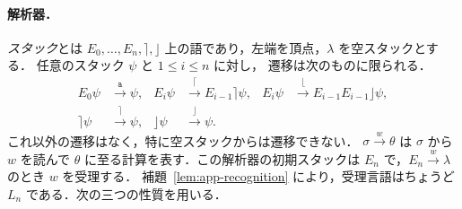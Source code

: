 \documentclass[11pt,a4paper]{ltjsarticle}
\theoremstyle{remark}
\theoremstyle{plain}
\begin{document}
\paragraph{解析器．}
\emph{スタック}とは $E_0,\ldots,E_n,\rceil,\rfloor$
上の語であり，左端を頂点，$\lambda$ を空スタックとする．
任意のスタック $\psi$ と $1\le i\le n$ に対し，
遷移は次のものに限られる．
\[
\begin{aligned}
E_0\psi&\xrightarrow{\mathtt a}\psi,&
E_i\psi&\xrightarrow{\lceil}E_{i-1}\rceil\psi,&
E_i\psi&\xrightarrow{\lfloor}E_{i-1}E_{i-1}\rfloor\psi,\\
\rceil\psi&\xrightarrow{\rceil}\psi,&
\rfloor\psi&\xrightarrow{\rfloor}\psi.
\end{aligned}
\]
これ以外の遷移はなく，特に空スタックからは遷移できない．
$\sigma\xrightarrow{w}\theta$ は $\sigma$ から $w$ を読んで
$\theta$ に至る計算を表す．この解析器の初期スタックは
$E_n$ で，$E_n\xrightarrow{w}\lambda$ のとき $w$ を受理する．
補題~\ref{lem:app-recognition} により，受理言語はちょうど
$L_n$ である．次の三つの性質を用いる．
\end{document}
